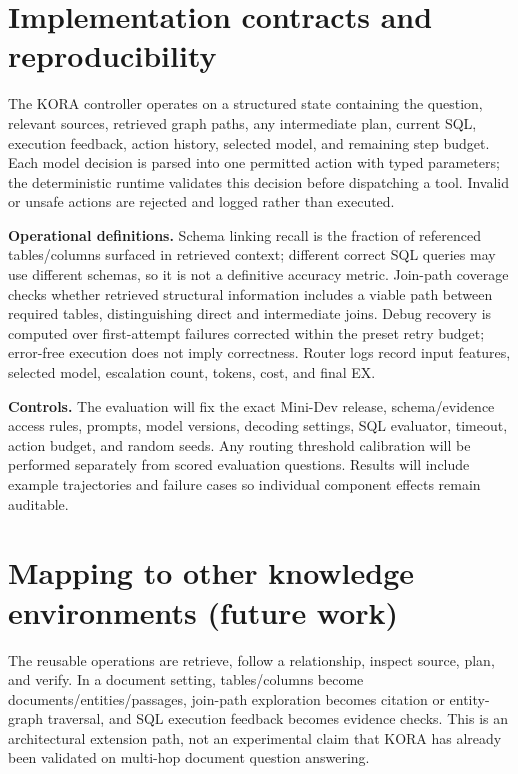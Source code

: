 \documentclass{article}
\begin{document}
\clearpage
\appendix
\section{Implementation contracts and reproducibility}
The KORA controller operates on a structured state containing the question, relevant sources, retrieved graph paths, any intermediate plan, current SQL, execution feedback, action history, selected model, and remaining step budget. Each model decision is parsed into one permitted action with typed parameters; the deterministic runtime validates this decision before dispatching a tool. Invalid or unsafe actions are rejected and logged rather than executed.

\textbf{Operational definitions.} Schema linking recall is the fraction of referenced tables/columns surfaced in retrieved context; different correct SQL queries may use different schemas, so it is not a definitive accuracy metric. Join-path coverage checks whether retrieved structural information includes a viable path between required tables, distinguishing direct and intermediate joins. Debug recovery is computed over first-attempt failures corrected within the preset retry budget; error-free execution does not imply correctness. Router logs record input features, selected model, escalation count, tokens, cost, and final EX.

\textbf{Controls.} The evaluation will fix the exact Mini-Dev release, schema/evidence access rules, prompts, model versions, decoding settings, SQL evaluator, timeout, action budget, and random seeds. Any routing threshold calibration will be performed separately from scored evaluation questions. Results will include example trajectories and failure cases so individual component effects remain auditable.

\section{Mapping to other knowledge environments (future work)}
The reusable operations are retrieve, follow a relationship, inspect source, plan, and verify. In a document setting, tables/columns become documents/entities/passages, join-path exploration becomes citation or entity-graph traversal, and SQL execution feedback becomes evidence checks. This is an architectural extension path, not an experimental claim that KORA has already been validated on multi-hop document question answering.
\end{document}
